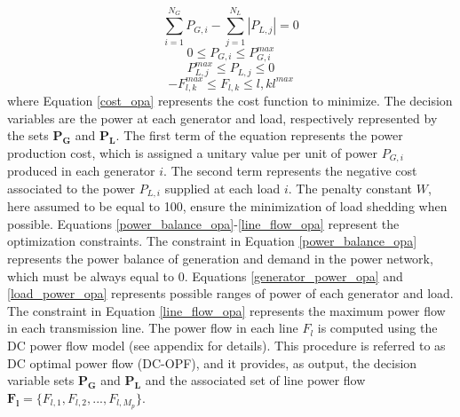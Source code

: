 \documentclass[review]{elsarticle}
\begin{document}
	\begin{equation}
	\sum_{i=1}^{N_G} P_{G,i} - \sum_{j=1}^{N_L} |P_{L,j}| = 0
	\label{power_balance_opa}
	\end{equation}
	\begin{equation}
	0 \le P_{G,i} \le P_{G,i}^{max}
	\label{generator_power_opa}
	\end{equation}
	\begin{equation}
	P_{L,j}^{max} \le P_{L,j} \le 0
	\label{load_power_opa}
	\end{equation}
	\begin{equation}
	-F_{l,k}^{max} \le F_{l,k} \le {l,k}l^{max}
	\label{line_flow_opa}
	\end{equation}
	where Equation \eqref{cost_opa} represents the cost function to minimize. The decision variables are the power at each generator and load, respectively represented by the sets $\mathbf{P_G}$ and $\mathbf{P_L}$. The first term of the equation represents the power production cost, which is assigned a unitary value per unit of power $P_{G,i}$ produced in each generator $i$. The second term represents the negative cost associated to the power $P_{L,i}$ supplied at each load $i$. The penalty constant $W$, here assumed to be equal to 100, ensure the minimization of load shedding when possible. Equations \eqref{power_balance_opa}-\eqref{line_flow_opa} represent the optimization constraints. The constraint in Equation \eqref{power_balance_opa} represents the power balance of generation and demand in the power network, which must be always equal to 0. Equations \eqref{generator_power_opa} and \eqref{load_power_opa} represents possible ranges of power of each generator and load. The constraint in Equation \eqref{line_flow_opa} represents the maximum power flow in each transmission line. The power flow in each line $F_l$ is computed using the DC power flow model (see appendix for details). This procedure is referred to as DC optimal power flow (DC-OPF), and it provides, as output, the decision variable sets $\mathbf{P_G}$ and $\mathbf{P_L}$ and the associated set of line power flow $\mathbf{F_l} = \{ F_{l,1}, F_{l,2},...,F_{l,M_p}  \}$. 
\end{document}
